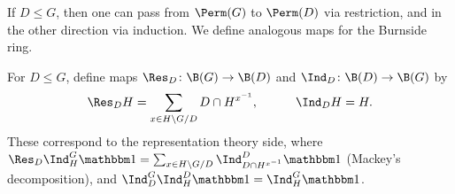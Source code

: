 If $D \leq G$, then one can pass from $\Perm(G)$ to $\Perm(D)$ via restriction, and in the other direction via induction. We define analogous maps for the Burnside ring.    

\begin{defn}
    For $D \leq G$, define maps $\Res_D \colon \B(G) \to \B(D)$ and $\Ind_D \colon \B(D) \to \B(G)$ by
    \[  \Res_D H = \sum_{x \in H \backslash G / D} D \cap H^{x^{-1}}, \qquad \quad \Ind_D H = H. \]
    These correspond to the representation theory side, where $\Res_D \Ind_{H}^G \trivial = \sum_{x \in H \backslash G / D} \Ind_{D \cap H^{x^{-1}}}^D \trivial$ (Mackey's decomposition), and $\Ind_{D}^G\Ind_{H}^D \trivial = \Ind_{H}^G \trivial$.
\end{defn}
